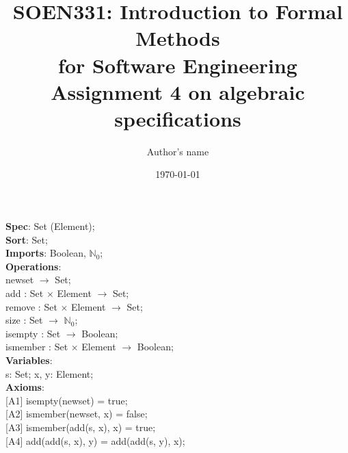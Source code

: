 \documentclass[12pt]{article}
\title{SOEN331: Introduction to Formal Methods\\for Software Engineering\\
Assignment 4 on algebraic specifications}
\author{Author's name}
\date{\today}
\begin{document}
\begin{spacing}{1.5}

\maketitle

\noindent \textbf{Spec}: Set (Element);\\
\noindent \textbf{Sort}: Set;\\
\noindent \textbf{Imports}: Boolean, $\mathbb{N}_0$;\\
\noindent \textbf{Operations}:\\
\hspace*{5mm} newset $\rightarrow$ Set;\\
\hspace*{5mm} add : Set $\times$ Element $\rightarrow$ Set;\\
\hspace*{5mm} remove : Set $\times$ Element $\rightarrow$ Set;\\
\hspace*{5mm} size : Set $\rightarrow$ $\mathbb{N}_0$;\\
\hspace*{5mm} isempty : Set $\rightarrow$ Boolean;\\
\hspace*{5mm} ismember : Set $\times$ Element $\rightarrow$ Boolean;\\
\noindent \textbf{Variables}:\\
\hspace*{5mm} s: Set; x, y: Element;\\
\noindent \textbf{Axioms}:\\
\hspace*{5mm} [A1] isempty(newset) = true;\\
\hspace*{5mm} [A2] ismember(newset, x) = false;\\
\hspace*{5mm} [A3] ismember(add(s, x), x) = true;\\
\hspace*{5mm} [A4] add(add(s, x), y) = add(add(s, y), x);\\



\end{spacing}
\end{document}
